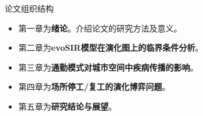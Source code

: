 \begin{frame}{论文组织结构}
    \begin{itemize}
        \item 第一章为\textbf{绪论}。介绍论文的研究方法及意义。
        \item 第二章为\textbf{evoSIR模型在演化图上的临界条件分析}。
        \item 第三章为\textbf{通勤模式对城市空间中疾病传播的影响}。
        \item 第四章为\textbf{场所停工/复工的演化博弈问题}。
        \item 第五章为\textbf{研究结论与展望}。
    \end{itemize}
\end{frame}